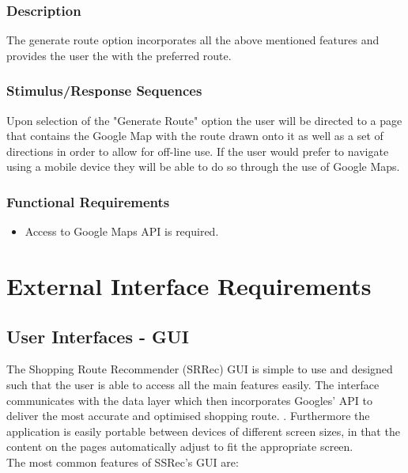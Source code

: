 \documentclass[10pt, a4paper, onecolumn]{scrartcl}
\begin{document}
			\subsubsection{Description}
			
				The generate route option incorporates all the above mentioned features and provides the user the with the preferred route. 
				
			\subsubsection{Stimulus/Response Sequences}
			
				Upon selection of the "Generate Route" option the user will be directed to a page that contains the Google Map with the route drawn onto it as well as a set of directions in order to allow for off-line use. If the user would prefer to navigate using a mobile device they will be able to do so through the use of Google Maps.
				
			\subsubsection{Functional Requirements}
			
				\begin{itemize}
					\item Access to Google Maps API is required.
				\end{itemize}
				
	
	\section{External Interface Requirements}
	
		\subsection{User Interfaces - GUI}
		
		
				The Shopping Route Recommender (SRRec) GUI is simple to use and designed such that the user is able to access all the main features easily. The interface communicates with the data layer which then incorporates Googles' API to deliver the most accurate and optimised shopping route. . Furthermore the application is easily portable between devices of different screen sizes, in that the content on the pages automatically adjust to fit the appropriate screen.\\
				
				The most common features of SSRec's GUI are:
				
\end{document}
